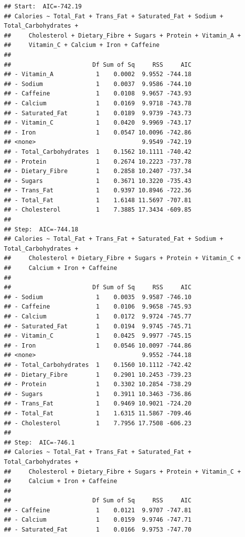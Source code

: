 \documentclass[
]{article}
\begin{document}
\begin{verbatim}
## Start:  AIC=-742.19
## Calories ~ Total_Fat + Trans_Fat + Saturated_Fat + Sodium + Total_Carbohydrates + 
##     Cholesterol + Dietary_Fibre + Sugars + Protein + Vitamin_A + 
##     Vitamin_C + Calcium + Iron + Caffeine
## 
##                       Df Sum of Sq     RSS     AIC
## - Vitamin_A            1    0.0002  9.9552 -744.18
## - Sodium               1    0.0037  9.9586 -744.10
## - Caffeine             1    0.0108  9.9657 -743.93
## - Calcium              1    0.0169  9.9718 -743.78
## - Saturated_Fat        1    0.0189  9.9739 -743.73
## - Vitamin_C            1    0.0420  9.9969 -743.17
## - Iron                 1    0.0547 10.0096 -742.86
## <none>                              9.9549 -742.19
## - Total_Carbohydrates  1    0.1562 10.1111 -740.42
## - Protein              1    0.2674 10.2223 -737.78
## - Dietary_Fibre        1    0.2858 10.2407 -737.34
## - Sugars               1    0.3671 10.3220 -735.43
## - Trans_Fat            1    0.9397 10.8946 -722.36
## - Total_Fat            1    1.6148 11.5697 -707.81
## - Cholesterol          1    7.3885 17.3434 -609.85
## 
## Step:  AIC=-744.18
## Calories ~ Total_Fat + Trans_Fat + Saturated_Fat + Sodium + Total_Carbohydrates + 
##     Cholesterol + Dietary_Fibre + Sugars + Protein + Vitamin_C + 
##     Calcium + Iron + Caffeine
## 
##                       Df Sum of Sq     RSS     AIC
## - Sodium               1    0.0035  9.9587 -746.10
## - Caffeine             1    0.0106  9.9658 -745.93
## - Calcium              1    0.0172  9.9724 -745.77
## - Saturated_Fat        1    0.0194  9.9745 -745.71
## - Vitamin_C            1    0.0425  9.9977 -745.15
## - Iron                 1    0.0546 10.0097 -744.86
## <none>                              9.9552 -744.18
## - Total_Carbohydrates  1    0.1560 10.1112 -742.42
## - Dietary_Fibre        1    0.2901 10.2453 -739.23
## - Protein              1    0.3302 10.2854 -738.29
## - Sugars               1    0.3911 10.3463 -736.86
## - Trans_Fat            1    0.9469 10.9021 -724.20
## - Total_Fat            1    1.6315 11.5867 -709.46
## - Cholesterol          1    7.7956 17.7508 -606.23
## 
## Step:  AIC=-746.1
## Calories ~ Total_Fat + Trans_Fat + Saturated_Fat + Total_Carbohydrates + 
##     Cholesterol + Dietary_Fibre + Sugars + Protein + Vitamin_C + 
##     Calcium + Iron + Caffeine
## 
##                       Df Sum of Sq     RSS     AIC
## - Caffeine             1    0.0121  9.9707 -747.81
## - Calcium              1    0.0159  9.9746 -747.71
## - Saturated_Fat        1    0.0166  9.9753 -747.70

\end{verbatim}
\end{document}
